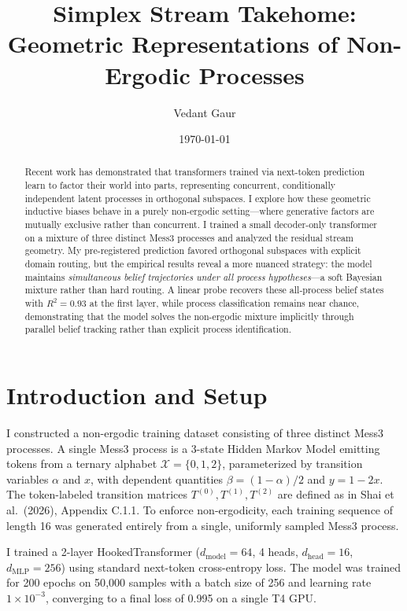 \documentclass[11pt]{article}
\title{Simplex Stream Takehome: Geometric Representations of Non-Ergodic Processes}
\author{Vedant Gaur}
\date{\today}
\begin{document}
\maketitle

\begin{abstract}
Recent work has demonstrated that transformers trained via next-token prediction learn to factor their world into parts, representing concurrent, conditionally independent latent processes in orthogonal subspaces. I explore how these geometric inductive biases behave in a purely non-ergodic setting---where generative factors are mutually exclusive rather than concurrent. I trained a small decoder-only transformer on a mixture of three distinct Mess3 processes and analyzed the residual stream geometry. My pre-registered prediction favored orthogonal subspaces with explicit domain routing, but the empirical results reveal a more nuanced strategy: the model maintains \emph{simultaneous belief trajectories under all process hypotheses}---a soft Bayesian mixture rather than hard routing. A linear probe recovers these all-process belief states with $R^2 = 0.93$ at the first layer, while process classification remains near chance, demonstrating that the model solves the non-ergodic mixture implicitly through parallel belief tracking rather than explicit process identification.
\end{abstract}

\section{Introduction and Setup}

I constructed a non-ergodic training dataset consisting of three distinct Mess3 processes. A single Mess3 process is a 3-state Hidden Markov Model emitting tokens from a ternary alphabet $\mathcal{X} = \{0,1,2\}$, parameterized by transition variables $\alpha$ and $x$, with dependent quantities $\beta = (1-\alpha)/2$ and $y = 1-2x$. The token-labeled transition matrices $T^{(0)}, T^{(1)}, T^{(2)}$ are defined as in Shai et al.\ (2026), Appendix C.1.1. To enforce non-ergodicity, each training sequence of length 16 was generated entirely from a single, uniformly sampled Mess3 process.

I trained a 2-layer HookedTransformer ($d_\text{model}=64$, 4 heads, $d_\text{head}=16$, $d_\text{MLP}=256$) using standard next-token cross-entropy loss. The model was trained for 200 epochs on 50{,}000 samples with a batch size of 256 and learning rate $1 \times 10^{-3}$, converging to a final loss of 0.995 on a single T4 GPU.
\end{document}
